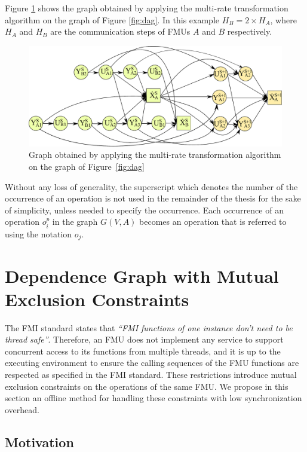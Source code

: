 Figure \ref{fig:dagmr} shows the graph obtained by applying the multi-rate transformation algorithm on the graph of Figure \ref{fig:dag}. In this example $H_B = 2 \times H_A$, where $H_A$ and $H_B$ are the communication steps of FMUs $A$ and $B$ respectively.

\begin{figure}[htb]
\captionsetup{justification=centering}
\centering
  \includegraphics[scale=0.5]{figures/Operation_Graph_Two_Models_Multirate}
\caption{Graph obtained by applying the multi-rate transformation algorithm on the graph of Figure~\ref{fig:dag}}
\label{fig:dagmr}
\end{figure}

Without any loss of generality, the superscript which denotes the number of the occurrence of an operation is not used in the remainder of the thesis for the sake of simplicity, unless needed to specify the occurrence. Each occurrence of an operation $o_i^p$ in the graph $G(V,A)$ becomes an operation that is referred to using the notation $o_j$.

\section{Dependence Graph with Mutual Exclusion Constraints}
The FMI standard states that \textit{``FMI functions of one instance don't need to be thread safe''}. Therefore, an FMU does not implement any service to support concurrent access to its functions from multiple threads, and it is up to the executing environment to ensure the calling sequences of the FMU functions are respected as specified in the FMI standard. These restrictions introduce mutual exclusion constraints on the operations of the same FMU. We propose in this section an offline method for handling these constraints with low synchronization overhead.

\subsection{Motivation}


